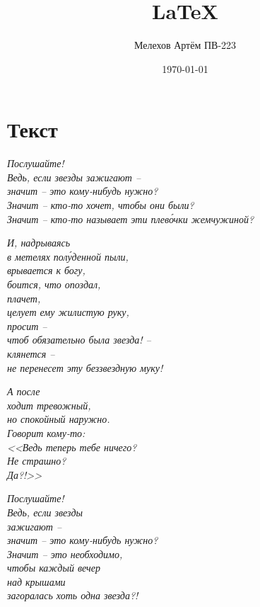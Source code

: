 \documentclass[a4paper, 12pt]{article}
\author{Мелехов Артём ПВ-223}
\title{LaTeX}
\date{\today}
\begin{document}
\maketitle

\newpage

\section{\centering Текст}

\begin{flushleft}
\textit{
Послушайте!\\
Ведь, если звезды зажигают --\\
значит -- это кому-нибудь нужно?\\
Значит -- кто-то хочет, чтобы они были?\\
Значит -- кто-то называет эти плево́чки жемчужиной?
}
\end{flushleft}

\begin{flushright}
\textit{
И, надрываясь\\
в метелях полу́денной пыли,\\
врывается к богу,\\
боится, что опоздал,\\
плачет,\\
целует ему жилистую руку,\\
просит --\\
чтоб обязательно была звезда! --\\
клянется --\\
не перенесет эту беззвездную муку!
}
\end{flushright}

\begin{flushleft}
\textit{
А после\\
ходит тревожный,\\
но спокойный наружно.\\
Говорит кому-то:\\
<<Ведь теперь тебе ничего?\\
Не страшно?\\
Да?!>>
}
\end{flushleft}

\begin{flushright}
\textit{
Послушайте!\\
Ведь, если звезды\\
зажигают --\\
значит -- это кому-нибудь нужно?\\
Значит -- это необходимо,\\
чтобы каждый вечер\\
над крышами\\
загоралась хоть одна звезда?!\\
}
\end{flushright}
\end{document}
